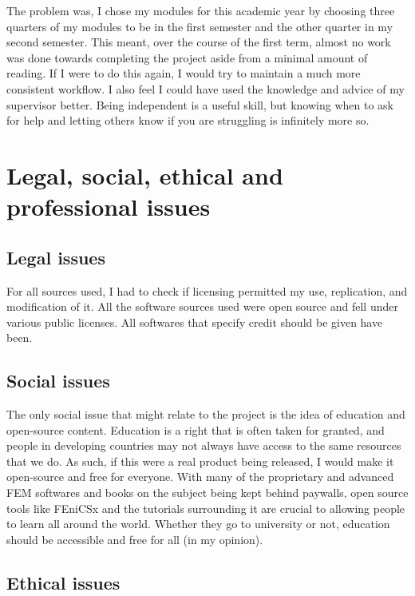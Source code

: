 \begin{appendices}
The problem was, I chose my modules for this academic year by choosing three quarters of my modules to be in the first semester and the other quarter in my second semester. This meant, over the course of the first term, almost no work was done towards completing the project aside from a minimal amount of reading. If I were to do this again, I would try to maintain a much more consistent workflow. I also feel I could have used the knowledge and advice of my supervisor better. Being independent is a useful skill, but knowing when to ask for help and letting others know if you are struggling is infinitely more so.

\section{Legal, social, ethical and professional issues}

\subsection{Legal issues}

For all sources used, I had to check if licensing permitted my use, replication, and modification of it. All the software sources used were open source and fell under various public licenses. All softwares that specify credit should be given have been.

\subsection{Social issues}

The only social issue that might relate to the project is the idea of education and open-source content. Education is a right that is often taken for granted, and people in developing countries may not always have access to the same resources that we do. As such, if this were a real product being released, I would make it open-source and free for everyone. With many of the proprietary and advanced FEM softwares and books on the subject being kept behind paywalls, open source tools like FEniCSx and the tutorials surrounding it are crucial to allowing people to learn all around the world. Whether they go to university or not, education should be accessible and free for all (in my opinion).

\subsection{Ethical issues}


\end{appendices}
